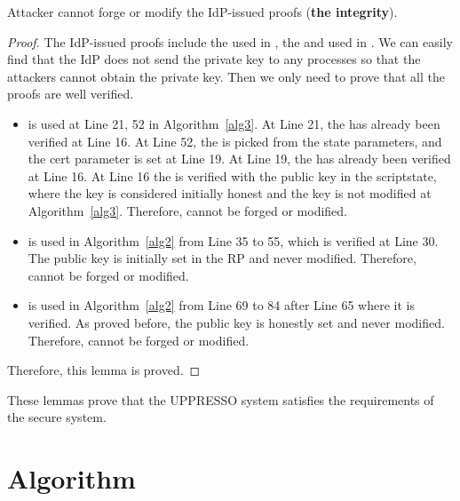 \begin{lemma}
Attacker cannot forge or modify the IdP-issued proofs (\textbf{the integrity}).
\label{lemma:integrity}
\end{lemma}
\begin{proof}
The IdP-issued proofs include the  used in , the  and  used in  . We can easily find that the IdP does not send the private key to any processes so that the attackers cannot obtain the private key. Then we only need to prove that all the proofs are well verified.
\begin{itemize}
\setlength\itemsep{-2pt}
\item {} is used at Line 21, 52 in Algorithm~\ref{alg3}. At Line 21, the  has already been verified at Line 16. At Line 52, the  is picked from the state parameters, and the cert parameter is set at Line 19.  At Line 19, the  has already been verified at Line 16.
At Line 16 the  is verified with the public key in the scriptstate, where the key is considered initially honest and the key is not modified at Algorithm~\ref{alg3}. Therefore,  cannot be forged or modified.
\item {} is used in Algorithm~\ref{alg2} from Line 35 to 55, which is verified at Line 30. The public key is initially set in the RP and never modified. Therefore,  cannot be forged or modified.
\item {} is used in Algorithm~\ref{alg2} from Line 69 to 84 after Line 65 where it is verified.  As proved before, the public key is honestly set and never modified. Therefore,  cannot be forged or modified.
\end{itemize}
Therefore, this lemma is proved.
\end{proof}

These lemmas prove that the UPPRESSO system satisfies the requirements of the secure system.





\onecolumn

\section{Algorithm}
\label{ape:alg}

